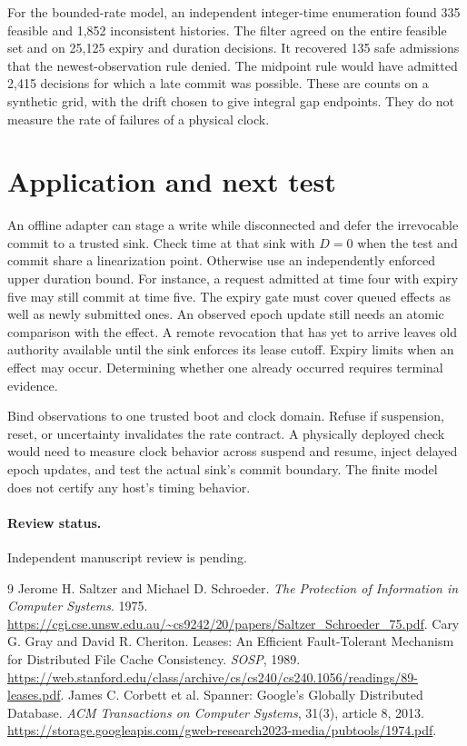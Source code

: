 \documentclass[11pt]{article}
\begin{document}
For the bounded-rate model, an independent integer-time
enumeration found 335 feasible and 1,852 inconsistent histories.
The filter agreed on the entire feasible set and on 25,125
expiry and duration decisions. It recovered 135 safe admissions
that the newest-observation rule denied. The midpoint rule
would have admitted 2,415 decisions for which a late commit
was possible. These are counts on a synthetic grid, with the
drift chosen to give integral gap endpoints. They do not
measure the rate of failures of a physical clock.

\section{Application and next test}
An offline adapter can stage a write while disconnected and defer
the irrevocable commit to a trusted sink. Check time at that sink
with $D=0$ when the test and commit share a linearization point.
Otherwise use an independently enforced upper duration bound.
For instance, a request admitted at time four with expiry five
may still commit at time five. The expiry gate must cover queued
effects as well as newly submitted ones. An observed epoch update
still needs an atomic comparison with the effect. A remote
revocation that has yet to arrive leaves old authority available
until the sink enforces its lease cutoff. Expiry limits when
an effect may occur. Determining whether one already occurred
requires terminal evidence.

Bind observations to one trusted boot and clock domain. Refuse
if suspension, reset, or uncertainty invalidates the rate
contract. A physically deployed check would need to measure
clock behavior across suspend and resume, inject delayed epoch
updates, and test the actual sink's commit boundary. The
finite model does not certify any host's timing behavior.

\paragraph{Review status.} Independent manuscript review is pending.

\begin{thebibliography}{9}
 Jerome H. Saltzer and Michael D. Schroeder. \emph{The Protection of Information in Computer Systems}. 1975. \url{https://cgi.cse.unsw.edu.au/~cs9242/20/papers/Saltzer_Schroeder_75.pdf}.
 Cary G. Gray and David R. Cheriton. Leases: An
Efficient Fault-Tolerant Mechanism for Distributed File Cache
Consistency. \emph{SOSP}, 1989.
\url{https://web.stanford.edu/class/archive/cs/cs240/cs240.1056/readings/89-leases.pdf}.
 James C. Corbett et al. Spanner: Google's
Globally Distributed Database. \emph{ACM Transactions on Computer
Systems}, 31(3), article 8, 2013.
\url{https://storage.googleapis.com/gweb-research2023-media/pubtools/1974.pdf}.
\end{thebibliography}
\end{document}

